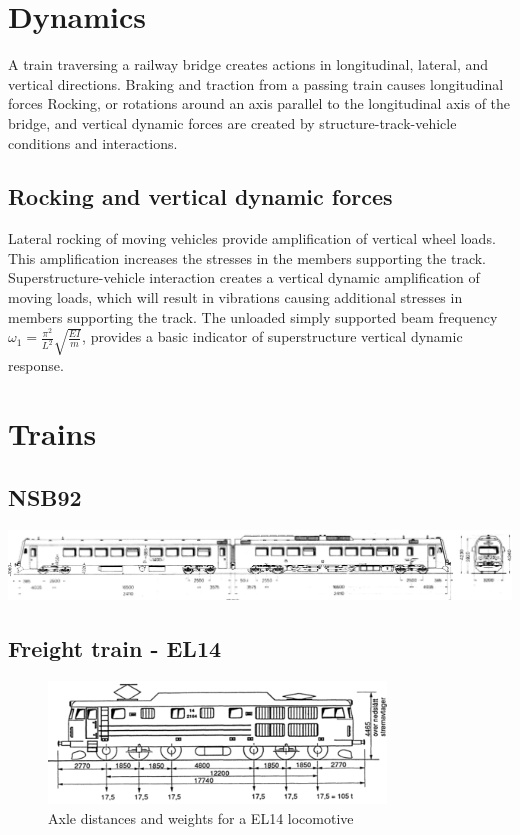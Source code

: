 \chapter{Dynamics}
A train traversing a railway bridge creates actions in longitudinal, lateral, and vertical directions. Braking and traction from a passing train causes longitudinal forces
Rocking, or rotations around an axis parallel to the longitudinal axis of the bridge, and vertical dynamic forces are created by structure-track-vehicle conditions and interactions.
\section{Rocking and vertical dynamic forces}
Lateral rocking of moving vehicles provide amplification of vertical  wheel loads. This amplification increases the stresses in the members supporting the track.
%
Superstructure-vehicle interaction creates a vertical dynamic amplification of moving loads, which will result in vibrations causing additional stresses in members supporting the track.
%
The unloaded simply supported beam frequency $\omega_1 = \frac{\pi^2}{L^2}\sqrt{\frac{EI}{m}}$, provides a basic indicator of superstructure vertical dynamic response.
%
\chapter{Trains}
\section{NSB92}
\label{appendix:nsb92}
\includegraphics[width=0.8\pageheight, height=0.5\pagewidth, angle=270]{./figures/nsb92.png}
\section{Freight train - EL14}
\label{appendix:el14}
\begin{figure}[H]
  \includegraphics[width=0.8\textwidth]{./figures/EL14.png}
  \caption{Axle distances and weights for a EL14 locomotive}
  \label{figure:el14_locomotive}
\end{figure}

